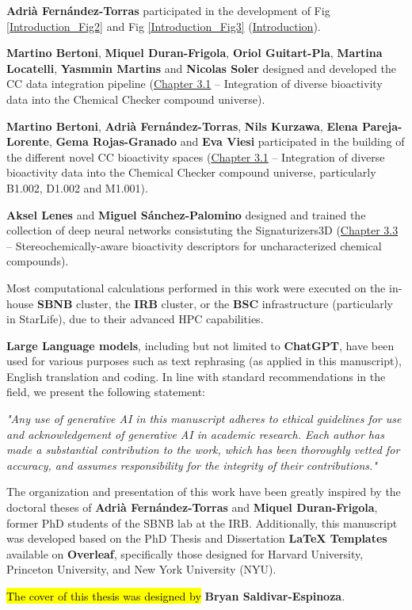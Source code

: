 

\textbf{Adrià Fernández-Torras} participated in the development of Fig \ref{Introduction_Fig2} and Fig \ref{Introduction_Fig3} (\hyperref[introduction]{Introduction}).

\textbf{Martino Bertoni}, \textbf{Miquel Duran-Frigola}, \textbf{Oriol Guitart-Pla}, \textbf{Martina Locatelli}, \textbf{Yasmmin Martins} and \textbf{Nicolas Soler} designed and developed the CC data integration pipeline (\hyperref[Chapter_3.1]{Chapter 3.1} -- Integration of diverse bioactivity data into the Chemical Checker compound universe).

\textbf{Martino Bertoni}, \textbf{Adrià Fernández-Torras}, \textbf{Nils Kurzawa}, \textbf{Elena Pareja-Lorente}, \textbf{Gema Rojas-Granado} and \textbf{Eva Viesi} participated in the building of the different novel CC bioactivity spaces (\hyperref[Chapter_3.1]{Chapter 3.1} -- Integration of diverse bioactivity data into the Chemical Checker compound universe, particularly B1.002, D1.002 and M1.001).

\textbf{Aksel Lenes} and \textbf{Miguel Sánchez-Palomino} designed and trained the collection of deep neural networks consistuting the Signaturizers3D (\hyperref[Chapter_3.3]{Chapter 3.3} -- Stereochemically-aware bioactivity descriptors for uncharacterized chemical compounds).

Most computational calculations performed in this work were executed on the in-house \textbf{SBNB} cluster, the \textbf{IRB} cluster, or the \textbf{BSC} infrastructure (particularly in StarLife), due to their advanced HPC capabilities.

\textbf{Large Language models}, including but not limited to \textbf{ChatGPT}, have been used for various purposes such as text rephrasing (as applied in this manuscript), English translation and coding. In line with standard recommendations in the field\cite{porsdam_mann_guidelines_2024}, we present the following statement:

\textit{"Any use of generative AI in this manuscript adheres to ethical guidelines for use and acknowledgement of generative AI in academic research. Each author has made a substantial contribution to the work, which has been thoroughly vetted for accuracy, and assumes responsibility for the integrity of their contributions."}

The organization and presentation of this work have been greatly inspired by the doctoral theses of \textbf{Adrià Fernández-Torras} and \textbf{Miquel Duran-Frigola}, former PhD students of the SBNB lab at the IRB. Additionally, this manuscript was developed based on the PhD Thesis and Dissertation \textbf{LaTeX Templates} available on \textbf{Overleaf}, specifically those designed for Harvard University, Princeton University, and New York University (NYU).

\hl{The cover of this thesis was designed by} \textbf{Bryan Saldivar-Espinoza}. 